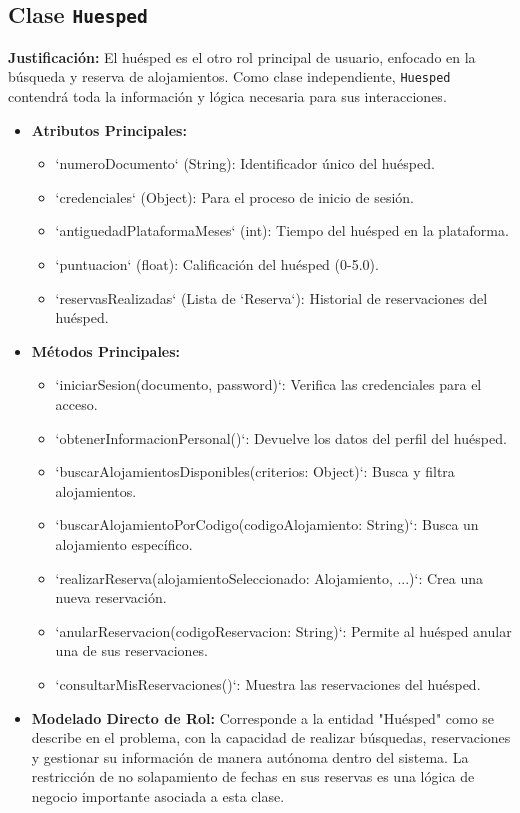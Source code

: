\documentclass[journal]{IEEEtran}
\begin{document}
\subsection{Clase \texttt{Huesped}}
\textbf{Justificación:} El huésped es el otro rol principal de usuario, enfocado en la búsqueda y reserva de alojamientos. Como clase independiente, \texttt{Huesped} contendrá toda la información y lógica necesaria para sus interacciones.
\begin{itemize}
    \item \textbf{Atributos Principales:}
        \begin{itemize}
            \item `numeroDocumento` (String): Identificador único del huésped.
            \item `credenciales` (Object): Para el proceso de inicio de sesión.
            \item `antiguedadPlataformaMeses` (int): Tiempo del huésped en la plataforma.
            \item `puntuacion` (float): Calificación del huésped (0-5.0).
            \item `reservasRealizadas` (Lista de `Reserva`): Historial de reservaciones del huésped.
        \end{itemize}
    \item \textbf{Métodos Principales:}
        \begin{itemize}
            \item `iniciarSesion(documento, password)`: Verifica las credenciales para el acceso.
            \item `obtenerInformacionPersonal()`: Devuelve los datos del perfil del huésped.
            \item `buscarAlojamientosDisponibles(criterios: Object)`: Busca y filtra alojamientos.
            \item `buscarAlojamientoPorCodigo(codigoAlojamiento: String)`: Busca un alojamiento específico.
            \item `realizarReserva(alojamientoSeleccionado: Alojamiento, ...)`: Crea una nueva reservación.
            \item `anularReservacion(codigoReservacion: String)`: Permite al huésped anular una de sus reservaciones.
            \item `consultarMisReservaciones()`: Muestra las reservaciones del huésped.
        \end{itemize}
    \item \textbf{Modelado Directo de Rol:} Corresponde a la entidad "Huésped" como se describe en el problema, con la capacidad de realizar búsquedas, reservaciones y gestionar su información de manera autónoma dentro del sistema. La restricción de no solapamiento de fechas en sus reservas es una lógica de negocio importante asociada a esta clase.
\end{itemize}
\end{document}
